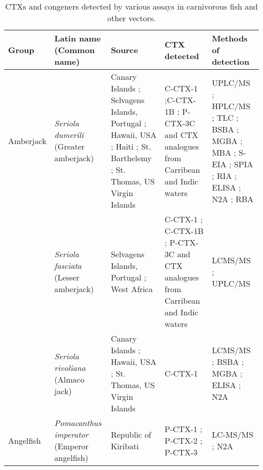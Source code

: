 \documentclass[12pt]{article}
\begin{document}
	\begin{longtable}[l]{ | p{2cm} | p{3cm} | p{4.5cm} | p{2cm} | p{3cm} | }
	\caption{CTXs and congeners detected by various assays in carnivorous fish and other vectors.}\\
	\hline
	\label{tbl:CarnTable}
	\textbf{Group} & \textbf{Latin name} (Common name) & \textbf{Source} & \textbf{CTX detected} & \textbf{Methods of detection} \\
	\hline
	Amberjack & \emph{Seriola dumerili} (Greater amberjack) & Canary Islands \cite{caillaud2012towards}; Selvagens Islands, Portugal \cite{otero2010first}; Hawaii, USA \cite{campora2008detection,hokama1977radioimmunoassay,hokama1983rapid,hokama1993evaluation}; Haiti \cite{poli1997identification}; St. Barthelemy \cite{vernoux1986heterogeneity}; St. Thomas, US Virgin Islands \cite{granade1976ciguatera} & C-CTX-1 \cite{poli1997identification};C-CTX-1B \cite{otero2010first}; P-CTX-3C and CTX analogues from Carribean and Indic waters \cite{otero2010first} & UPLC/MS \cite{otero2010first}; HPLC/MS \cite{poli1997identification}; TLC \cite{vernoux1986heterogeneity}; BSBA \cite{granade1976ciguatera}; MGBA \cite{campora2008detection,granade1976ciguatera}; MBA \cite{hokama1983rapid,hokama1993evaluation,vernoux1986heterogeneity}; S-EIA \cite{hokama1993evaluation}; SPIA \cite{otero2010first}; RIA \cite{campora2008detection,hokama1983rapid}; ELISA \cite{campora2008detection}; N2A \cite{caillaud2012towards,campora2008detection}; RBA \cite{poli1997identification} \\
	& \emph{Seriola fasciata} (Lesser amberjack) & Selvagens Islands, Portugal \cite{otero2010first}; West Africa \cite{boada2010ciguatera} & C-CTX-1 \cite{boada2010ciguatera}; C-CTX-1B \cite{otero2010first}; P-CTX-3C and CTX analogues from Carribean and Indic waters \cite{otero2010first} & LCMS/MS \cite{boada2010ciguatera}; UPLC/MS \cite{otero2010first}\\
	& \emph{Seriola rivoliana} (Almaco jack) & Canary Islands \cite{campora2010evaluating}; Hawaii, USA \cite{campora2008detection}; St. Thomas, US Virgin Islands \cite{granade1976ciguatera} & C-CTX-1 \cite{rivoliana1999ciguatera} & LCMS/MS \cite{rivoliana1999ciguatera}; BSBA \cite{granade1976ciguatera}; MGBA \cite{granade1976ciguatera}; ELISA \cite{campora2008detection,campora2010evaluating}; N2A \cite{campora2008detection,campora2010evaluating} \\ 
	\hline
	Angelfish  & \emph{Pomacanthus imperator} (Emperor angelfish) & Republic of Kiribati \cite{mak2013pacific} & P-CTX-1 \cite{mak2013pacific}; P-CTX-2 \cite{mak2013pacific}; P-CTX-3 \cite{mak2013pacific} & LC-MS/MS \cite{mak2013pacific}; N2A \cite{mak2013pacific} \\

\end{longtable}
\end{document}

